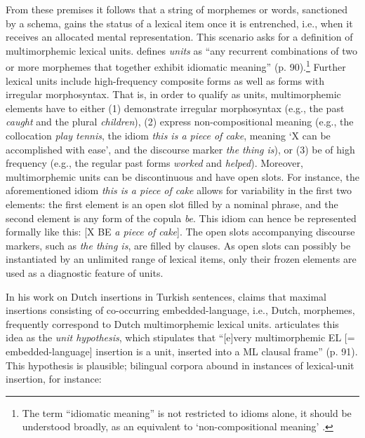 From these premises it follows that a string of morphemes or words, sanctioned by a schema, gains the status of a lexical item once it is entrenched, i.e., when it receives an allocated mental representation. This scenario asks for a definition of multimorphemic lexical units. \citet{backus-units-2003} defines \textit{units} as ``any recurrent combinations of two or more morphemes that together exhibit idiomatic meaning'' (p. 90).\footnote{
The term ``idiomatic meaning'' is not restricted to idioms alone, it should be understood broadly, as an equivalent to `non-compositional meaning' \citep[cf.][86]{backus-units-2003}.} Further lexical units include high-frequency composite forms as well as forms with irregular morphosyntax. That is, in order to qualify as units, multimorphemic elements have to either (1) demonstrate irregular morphosyntax (e.g., the past \textit{caught} and the plural \textit{children}), (2) express non-compositional meaning (e.g., the collocation \textit{play tennis}, the idiom \textit{this is a piece of cake}, meaning `X can be accomplished with ease', and the discourse marker \textit{the thing is}), or (3) be of high frequency (e.g., the regular past forms \textit{worked} and \textit{helped}). Moreover, multimorphemic units can be discontinuous and have open slots. For instance, the aforementioned idiom \textit{this is a piece of cake} allows for variability in the first two elements: the first element is an open slot filled by a nominal phrase, and the second element is any form of the copula \textit{be}. This idiom can hence be represented formally like this: [X BE \textit{a piece of cake}]. The open slots accompanying discourse markers, such as \textit{the thing is}, are filled by clauses. As open slots can possibly be instantiated by an unlimited range of lexical items, only their frozen elements are used as a diagnostic feature of units.

\begin{sloppypar}
In his work on Dutch insertions in Turkish sentences, \citet{backus-evidence-1999} claims that maximal insertions consisting of co-occurring embedded-language, i.e., Dutch, morphemes, frequently correspond to Dutch multimorphemic lexical units. \citet{backus-units-2003} articulates this idea as the \textit{unit hypothesis}, which stipulates that ``[e]very multimorphemic EL [= embedded-language] insertion is a unit, inserted into a ML clausal frame'' (p. 91). This hypothesis is plausible; bilingual corpora abound in instances of lexical-unit insertion, for instance:
\end{sloppypar}

